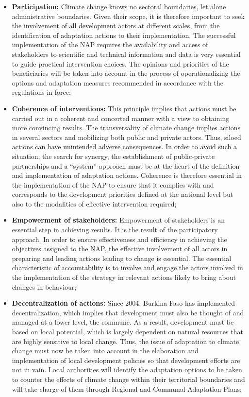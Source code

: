 \documentclass[
]{book}
\begin{document}
\begin{itemize}
\item
  \textbf{Participation:} Climate change knows no sectoral boundaries, let alone administrative boundaries. Given their scope, it is therefore important to seek the involvement of all development actors at different scales, from the identification of adaptation actions to their implementation. The successful implementation of the NAP requires the availability and access of stakeholders to scientific and technical information and data is very essential to guide practical intervention choices. The opinions and priorities of the beneficiaries will be taken into account in the process of operationalizing the options and adaptation measures recommended in accordance with the regulations in force;
\item
  \textbf{Coherence of interventions:} This principle implies that actions must be carried out in a coherent and concerted manner with a view to obtaining more convincing results. The transversality of climate change implies actions in several sectors and mobilizing both public and private actors. Thus, siloed actions can have unintended adverse consequences. In order to avoid such a situation, the search for synergy, the establishment of public-private partnerships and a ``system'' approach must be at the heart of the definition and implementation of adaptation actions. Coherence is therefore essential in the implementation of the NAP to ensure that it complies with and corresponds to the development priorities defined at the national level but also to the modalities of effective intervention required;
\item
  \textbf{Empowerment of stakeholders:} Empowerment of stakeholders is an essential step in achieving results. It is the result of the participatory approach. In order to ensure effectiveness and efficiency in achieving the objectives assigned to the NAP, the effective involvement of all actors in preparing and leading actions leading to change is essential. The essential characteristic of accountability is to involve and engage the actors involved in the implementation of the strategy in relevant actions likely to bring about changes in behaviour;
\item
  \textbf{Decentralization of actions:} Since 2004, Burkina Faso has implemented decentralization, which implies that development must also be thought of and managed at a lower level, the commune. As a result, development must be based on local potential, which is largely dependent on natural resources that are highly sensitive to local change. Thus, the issue of adaptation to climate change must now be taken into account in the elaboration and implementation of local development policies so that development efforts are not in vain. Local authorities will identify the adaptation options to be taken to counter the effects of climate change within their territorial boundaries and will take charge of them through Regional and Communal Adaptation Plans;

\end{itemize}
\end{document}
